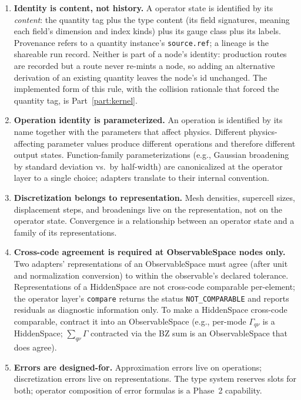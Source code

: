 \documentclass[11pt,a4paper]{article}
\begin{document}
\begin{enumerate}[leftmargin=2.5em, itemsep=0.4em]
  \item \textbf{Identity is content, not history.} A operator state is identified by its
        \emph{content}: the quantity tag plus the type content (its field
        signatures, meaning each field's dimension and index kinds) plus its
        gauge class plus its labels. Provenance refers to a quantity instance's
        \texttt{source.ref}; a lineage is the shareable run record. Neither is part
        of a node's identity: production routes are recorded but a route never re-mints
        a node, so adding an alternative derivation of an existing quantity leaves
        the node's id unchanged. The implemented form of this rule, with the
        collision rationale that forced the quantity tag, is Part~\ref{part:kernel}.

  \item \textbf{Operation identity is parameterized.} An operation is identified by its
        name together with the parameters that affect physics. Different physics-affecting
        parameter values produce different operations and therefore different output
        states. Function-family parameterizations (e.g., Gaussian broadening by standard
        deviation vs.\ by half-width) are canonicalized at the operator layer to a single
        choice; adapters translate to their internal convention.

  \item \textbf{Discretization belongs to representation.} Mesh densities, supercell
        sizes, displacement steps, and broadenings live on the representation, not on
        the operator state. Convergence is a relationship between an operator state and
        a family of its representations.

  \item \textbf{Cross-code agreement is required at ObservableSpace nodes only.} Two
        adapters' representations of an ObservableSpace must agree (after unit and
        normalization conversion) to within the observable's declared tolerance.
        Representations of a HiddenSpace are not cross-code comparable per-element;
        the operator layer's \texttt{compare} returns the status \texttt{NOT\_COMPARABLE}
        and reports residuals as diagnostic information only. To make a HiddenSpace
        cross-code comparable, contract it into an ObservableSpace (e.g., per-mode
        $\Gamma_{q\nu}$ is a HiddenSpace; $\sum_{q\nu}\Gamma$ contracted via the
        BZ sum is an ObservableSpace that does agree).

  \item \textbf{Errors are designed-for.} Approximation errors live on operations;
        discretization errors live on representations. The type system reserves slots
        for both; operator composition of error formulas is a Phase~2 capability.


\end{enumerate}
\end{document}
